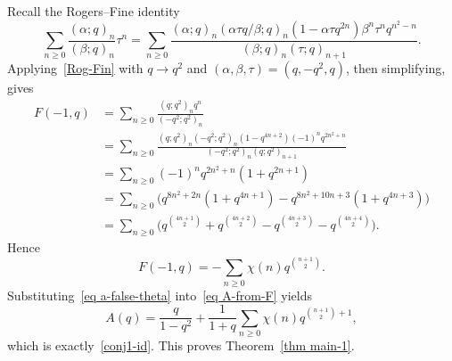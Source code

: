 \documentclass[reqno]{amsart}
\theoremstyle{definition}
\theoremstyle{plain}
\theoremstyle{remark}
\numberwithin{equation}{section}
\newcommand{\fr}{\frac}
\begin{document}
Recall the Rogers--Fine identity~\cite[p.223, Eq. (9.1.1)]{Andrews-Berndt 1}
\begin{equation}\label{Rog-Fin}
\sum_{n\geq 0}\fr{(\alpha;q)_n}{(\beta;q)_n}\tau^n
=\sum_{n\geq 0}\fr{(\alpha;q)_n (\alpha\tau q/\beta;q)_n (1-\alpha\tau q^{2n})\beta^n \tau^n q^{n^2-n}}{(\beta;q)_n (\tau ;q)_{n+1}}.
\end{equation}
Applying~\eqref{Rog-Fin} with $q \to q^2$ and $(\alpha,\beta,\tau)=(q,-q^2,q)$, then simplifying, gives
\begin{align*}
F(-1,q)
&=\sum_{n\geq 0}\fr{(q;q^2)_n q^n}{(-q^2;q^2)_n}\\
&=\sum_{n\geq 0}\fr{(q;q^2)_n (-q^2;q^2)_n (1-q^{4n+2})(-1)^n q^{2n^2+n}}{(-q^2;q^2)_n (q;q^2)_{n+1}} \\
&=\sum_{n\geq 0}(-1)^n q^{2n^2+n}(1+q^{2n+1}) \\
&=\sum_{n\geq 0}\Big( q^{8n^2+2n}(1+q^{4n+1})-q^{8n^2+10n+3}(1+q^{4n+3}) \Big) \\
&= \sum_{n\geq 0} \Big( q^{\binom{4n+1}{2}}+q^{\binom{4n+2}{2}}-q^{\binom{4n+3}{2}}-q^{\binom{4n+4}{2}} \Big).
\end{align*}
Hence
\begin{equation}\label{eq a-false-theta}
F(-1,q)=-\sum_{n\geq 0} \chi(n) q^{\binom{n+1}{2}}.
\end{equation}
Substituting~\eqref{eq a-false-theta} into~\eqref{eq A-from-F} yields
\[
A(q)=\fr{q}{1-q^2}+\fr{1}{1+q}\sum_{n\geq 0}\chi(n)q^{\binom{n+1}{2}+1},
\]
which is exactly~\eqref{conj1-id}. This proves Theorem~\ref{thm main-1}.
\end{document}
